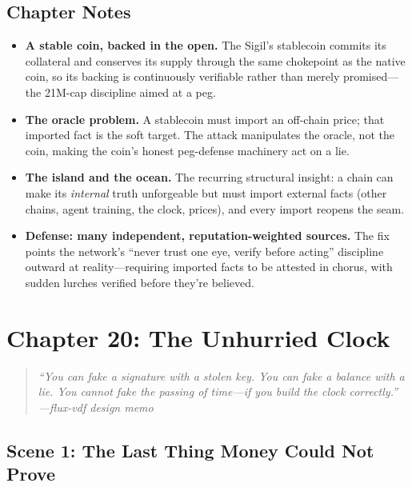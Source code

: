 \documentclass[12pt,letterpaper]{book}
\providecommand{\tightlist}{\setlength{\itemsep}{0pt}\setlength{\parskip}{0pt}}
\begin{document}
\hypertarget{chapter-19-notes}{%
\subsection{Chapter Notes}\label{chapter-19-notes}}

\begin{itemize}
\tightlist
\item
  \textbf{A stable coin, backed in the open.} The Sigil's stablecoin commits its
  collateral and conserves its supply through the same chokepoint as the native
  coin, so its backing is continuously verifiable rather than merely promised---the
  21M-cap discipline aimed at a peg.
\item
  \textbf{The oracle problem.} A stablecoin must import an off-chain price; that
  imported fact is the soft target. The attack manipulates the oracle, not the
  coin, making the coin's honest peg-defense machinery act on a lie.
\item
  \textbf{The island and the ocean.} The recurring structural insight: a chain can
  make its \emph{internal} truth unforgeable but must import external facts (other
  chains, agent training, the clock, prices), and every import reopens the seam.
\item
  \textbf{Defense: many independent, reputation-weighted sources.} The fix points
  the network's ``never trust one eye, verify before acting'' discipline outward at
  reality---requiring imported facts to be attested in chorus, with sudden lurches
  verified before they're believed.
\end{itemize}


\hypertarget{chapter-20-the-unhurried-clock}{%
\section{Chapter 20: The Unhurried
Clock}\label{chapter-20-the-unhurried-clock}}

\begin{quote}
\itshape ``You can fake a signature with a stolen key. You can fake a balance with
a lie. You cannot fake the passing of time---if you build the clock correctly.''\\
\normalfont\hfill---flux-vdf design memo
\end{quote}

\hypertarget{scene-1-the-last-thing-money-could-not-prove}{%
\subsection{Scene 1: The Last Thing Money Could Not
Prove}\label{scene-1-the-last-thing-money-could-not-prove}}
\end{document}

